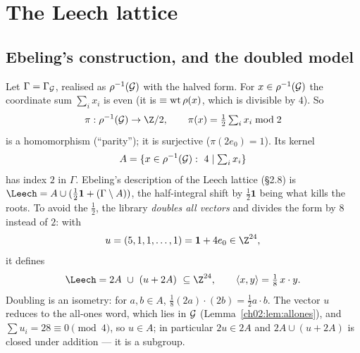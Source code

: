 \section{The Leech lattice}\label{ch02:sec:leech}

\subsection{Ebeling's construction, and the doubled model}

Let $\Gamma=\Gamma_{\mathcal{G}}$, realised as $\rho^{-1}(\mathcal{G})$ with the halved form.  For
$x\in\rho^{-1}(\mathcal{G})$ the coordinate sum $\sum_ix_i$ is even (it is $\equiv\operatorname{wt}\rho(x)$,
which is divisible by $4$).  So
\begin{equation*}
\pi:\rho^{-1}(\chtwoG)\to\Z/2,\qquad \pi(x)=\tfrac12\textstyle\sum_ix_i\bmod2
\end{equation*}
is a homomorphism (``parity''); it is surjective ($\pi(2e_0)=1$).  Its kernel
\begin{equation*}
A=\{x\in\rho^{-1}(\chtwoG):\ 4\mid\textstyle\sum_ix_i\}
\end{equation*}
has index $2$ in $\Gamma$.  Ebeling's description of the Leech lattice (\S2.8) is
$\Leech=A\cup(\tfrac12\mathbf 1+(\Gamma\setminus A))$, the half-integral shift by $\tfrac12\mathbf
1$ being what kills the roots.  To avoid the $\tfrac12$, the library \emph{doubles all vectors}
and divides the form by $8$ instead of $2$: with
\begin{equation*}
u=(5,1,1,\dots,1)=\mathbf 1+4e_0\in\Z^{24},
\end{equation*}
it defines
\begin{equation}\label{ch02:eq:leech}
\Leech=2A\ \cup\ (u+2A)\ \subseteq\Z^{24},\qquad \langle x,y\rangle=\tfrac18\,x\cdot y .
\end{equation}
Doubling is an isometry: for $a,b\in A$, $\tfrac18(2a)\cdot(2b)=\tfrac12a\cdot b$.  The vector
$u$ reduces to the all-ones word, which lies in $\mathcal{G}$ (Lemma~\ref{ch02:lem:allones}), and
$\sum u_i=28\equiv0\pmod4$, so $u\in A$; in particular $2u\in2A$ and $2A\cup(u+2A)$ is closed
under addition --- it is a subgroup.

